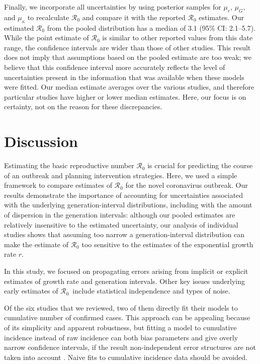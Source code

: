 \documentclass[12pt]{article}
\newcommand{\Rx}[1]{\ensuremath{{\mathcal R}_{#1}}}
\newcommand{\Ro}{\Rx{0}\xspace}
\begin{document}
Finally, we incorporate all uncertainties by using posterior samples for $\mu_r$, $\mu_G$, and $\mu_\kappa$ to recalculate \Ro and compare it with the reported \Ro estimates.
Our estimated \Ro from the pooled distribution has a median of 3.1 (95\% CI: 2.1--5.7).
While the point estimate of \Ro is similar to other reported values from this date range, the confidence intervals are wider than those of other studies.
This result does not imply that assumptions based on the pooled estimate are too weak;
we believe that this confidence interval more accurately reflects the level of uncertainties present in the information that was available when these models were fitted.
Our median estimate averages over the various studies, and therefore particular studies have higher or lower median estimates.
Here, our focus is on certainty, not on the reason for these discrepancies.

\section{Discussion}

Estimating the basic reproductive number \Ro is crucial for predicting the course of an outbreak and planning intervention strategies.
Here, we used a simple framework \citep{park2019practical} to compare estimates of \Ro for the novel coronavirus outbreak.
Our results demonstrate the importance of accounting for uncertainties associated with the underlying generation-interval distributions, including with the amount of dispersion in the generation intervals:
although our pooled estimates are relatively insensitive to the estimated uncertainty, our analysis of individual studies shows that assuming too narrow a generation-interval distribution can make the estimate of \Ro too sensitive to the estimates of the exponential growth rate $r$.

In this study, we focused on propagating errors arising from implicit or explicit estimates of growth rate and generation intervals. Other key issues underlying early estimates of \Ro\ include statistical independence and types of noise. 

Of the six studies that we reviewed, two of them directly fit their models to cumulative number of confirmed cases.
This approach can be appealing because of its simplicity and apparent robustness, but fitting a model to cumulative incidence instead of raw incidence can both bias parameters and give overly narrow confidence intervals, if the result non-independent error structures are not taken into account \citep{ma2014estimating, king2015avoidable}.
Naive fits to cumulative incidence data should be avoided.
\end{document}
